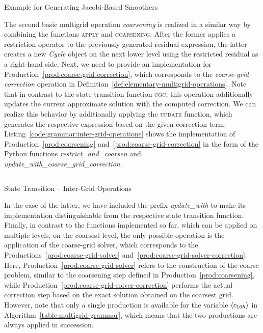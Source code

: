 \begin{listing}
	\inputminted{python}{evostencils/grammar/jacobi.py}
	\caption{Example for Generating Jacobi-Based Smoothers}
	\label{code:grammar:jacobi}
\end{listing}
The second basic multigrid operation \emph{coarsening} is realized in a similar way by combining the functions \textsc{apply} and \textsc{coarsening}.
After the former applies a restriction operator to the previously generated residual expression, the latter creates a new \emph{Cycle} object on the next lower level using the restricted residual as a right-hand side.
Next, we need to provide an implementation for Production~\eqref{prod:coarse-grid-correction}, which corresponds to the \emph{coarse-grid correction} operation in Definition~\ref{def:elementary-multigrid-operations}.
Note that in contrast to the state transition function \textsc{cgc}, this operation additionally updates the current approximate solution with the computed correction.
We can realize this behavior by additionally applying the \textsc{update} function, which generates the respective expression based on the given correction term.
Listing~\ref{code:grammar:inter-grid-operations} shows the implementation of Production~\eqref{prod:coarsening} and~\ref{prod:coarse-grid-correction} in the form of the Python functions \emph{restrict\_and\_coarsen} and \emph{update\_with\_coarse\_grid\_correction}.
\begin{listing}
	\inputminted{python}{evostencils/grammar/inter_grid_operations.py}
	\caption{State Transition -- Inter-Grid Operations}
	\label{code:grammar:inter-grid-operations}
\end{listing}
In the case of the latter, we have included the prefix \emph{update\_with} to make its implementation distinguishable from the respective state transition function.
Finally, in contrast to the functions implemented so far, which can be applied on multiple levels, on the coarsest level, the only possible operation is the application of the coarse-grid solver, which corresponds to the Productions~\eqref{prod:coarse-grid-solver} and~\eqref{prod:coarse-grid-solver-correction}.
Here, Production~\eqref{prod:coarse-grid-solver} refers to the construction of the coarse problem, similar to the coarsening step defined in Production~\eqref{prod:coarsening}, while Production~\eqref{prod:coarse-grid-solver-correction} performs the actual correction step based on the exact solution obtained on the coarsest grid. 
However, note that only a single production is available for the variable $\langle c_{16h} \rangle$ in Algorithm~\ref{table:multigrid-grammar}, which means that the two productions are always applied in succession.
